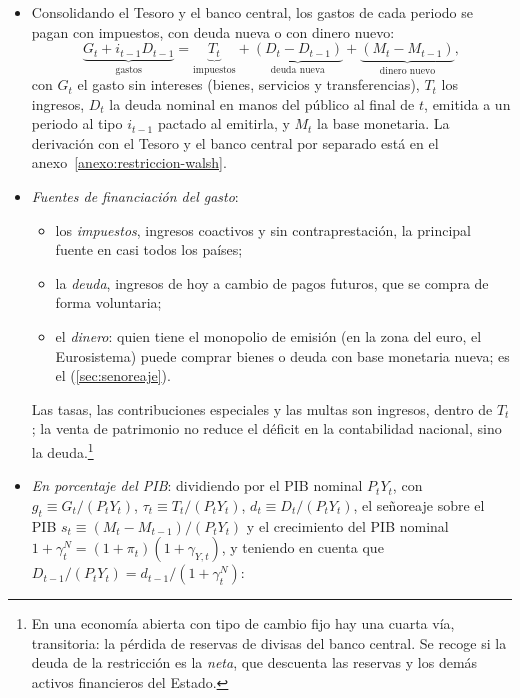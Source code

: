 \documentclass[11pt]{article}
\begin{document}
\begin{itemize}
\item Consolidando el Tesoro y el banco central, los gastos de cada periodo se pagan con impuestos, con deuda nueva o con dinero nuevo\nocite{Walsh2017Monetary}:
  \begin{equation}\label{eq:restriccion-nivel}
  \underbrace{G_t+i_{t-1}D_{t-1}}_{\text{gastos}}=\underbrace{T_t}_{\text{impuestos}}+\underbrace{(D_t-D_{t-1})}_{\text{deuda nueva}}+\underbrace{(M_t-M_{t-1})}_{\text{dinero nuevo}},
  \end{equation}
  con $G_t$ el gasto sin intereses (bienes, servicios y transferencias), $T_t$ los ingresos, $D_t$ la deuda nominal en manos del público al final de $t$, emitida a un periodo al tipo $i_{t-1}$ pactado al emitirla, y $M_t$ la base monetaria. La derivación con el Tesoro y el banco central por separado está en el anexo~\ref{anexo:restriccion-walsh}.
\item \emph{Fuentes de financiación del gasto}:
  \begin{itemize}
  \item los \emph{impuestos}, ingresos coactivos y sin contraprestación, la principal fuente en casi todos los países;
  \item la \emph{deuda}, ingresos de hoy a cambio de pagos futuros, que se compra de forma voluntaria;
  \item el \emph{dinero}: quien tiene el monopolio de emisión (en la zona del euro, el Eurosistema) puede comprar bienes o deuda con base monetaria nueva; es el  (\ref{sec:senoreaje}).
  \end{itemize}
  Las tasas, las contribuciones especiales y las multas son ingresos, dentro de $T_t$; la venta de patrimonio no reduce el déficit en la contabilidad nacional, sino la deuda.\footnote{En una economía abierta con tipo de cambio fijo hay una cuarta vía, transitoria: la pérdida de reservas de divisas del banco central. Se recoge si la deuda de la restricción es la \emph{neta}, que descuenta las reservas y los demás activos financieros del Estado.}
\item \emph{En porcentaje del PIB}: dividiendo por el PIB nominal $P_tY_t$, con $g_t\equiv G_t/(P_tY_t)$, $\tau_t\equiv T_t/(P_tY_t)$, $d_t\equiv D_t/(P_tY_t)$, el señoreaje sobre el PIB $s_t\equiv(M_t-M_{t-1})/(P_tY_t)$ y el crecimiento del PIB nominal $1+\gamma^N_t=(1+\pi_t)(1+\gamma_{Y,t})$, y teniendo en cuenta que $D_{t-1}/(P_tY_t)=d_{t-1}/(1+\gamma^N_t)$:

\end{itemize}
\end{document}
